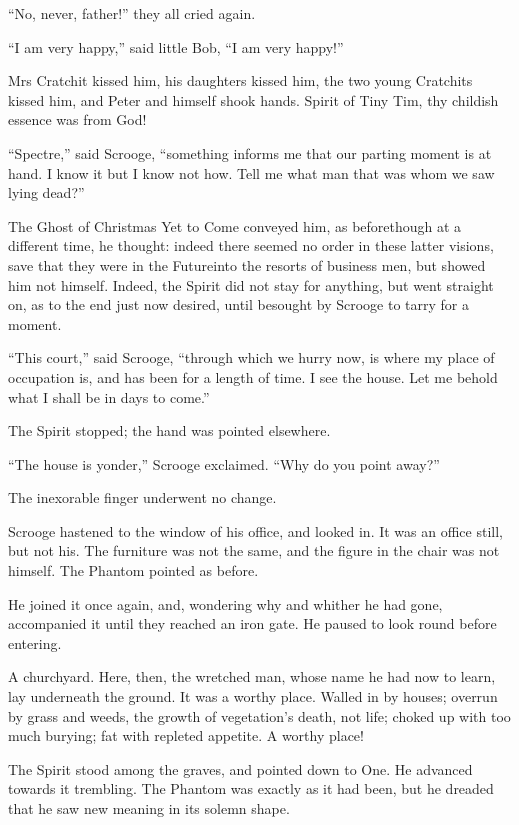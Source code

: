 \documentclass[paper=5.5in:8.5in,BCOR=5mm,twoside,DIV=calc,12pt,usegeometry]{scrbook} %
\begin{document}
\enquote{No, never, father!} they all cried again.

\enquote{I am very happy,} said little Bob, \enquote{I am very happy!}

Mrs Cratchit kissed him, his daughters kissed him, the two young Cratchits kissed him, and Peter and himself shook hands. Spirit of Tiny Tim, thy childish essence was from God!

\enquote{Spectre,} said Scrooge, \enquote{something informs me that our parting moment is at hand. I know it but I know not how. Tell me what man that was whom we saw lying dead?}

The Ghost of Christmas Yet to Come conveyed him, as before\textemdash though at a different time, he thought: indeed there seemed no order in these latter visions, save that they were in the Future\textemdash into the resorts of business men, but showed him not himself. Indeed, the Spirit did not stay for anything, but went straight on, as to the end just now desired, until besought by Scrooge to tarry for a moment.

\enquote{This court,} said Scrooge, \enquote{through which we hurry now, is where my place of occupation is, and has been for a length of time. I see the house. Let me behold what I shall be in days to come.}

The Spirit stopped; the hand was pointed elsewhere.

\enquote{The house is yonder,} Scrooge exclaimed. \enquote{Why do you point away?}

The inexorable finger underwent no change.

Scrooge hastened to the window of his office, and looked in. It was an office still, but not his. The furniture was not the same, and the figure in the chair was not himself. The Phantom pointed as before.

He joined it once again, and, wondering why and whither he had gone, accompanied it until they reached an iron gate. He paused to look round before entering.

A churchyard. Here, then, the wretched man, whose name he had now to learn, lay underneath the ground. It was a worthy place. Walled in by houses; overrun by grass and weeds, the growth of vegetation's death, not life; choked up with too much burying; fat with repleted appetite. A worthy place!

The Spirit stood among the graves, and pointed down to One. He advanced towards it trembling. The Phantom was exactly as it had been, but he dreaded that he saw new meaning in its solemn shape.
\end{document}
